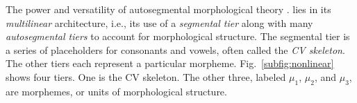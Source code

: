 The power and versatility of autosegmental morphological theory \citep{mccarthy:1981}.
lies in its \emph{multilinear} architecture, i.e., its
use of a \emph{segmental tier} along with many \emph{autosegmental tiers} to account for morphological structure. The segmental tier is
a series of placeholders for consonants and vowels, often called the
\emph{CV skeleton}. The other tiers each represent a particular
morpheme. Fig.~\ref{subfig:nonlinear} shows four tiers. One is the CV
skeleton. The other three, labeled $\mu_1$, $\mu_2$, and $\mu_3$, are
morphemes, or units of morphological structure.

